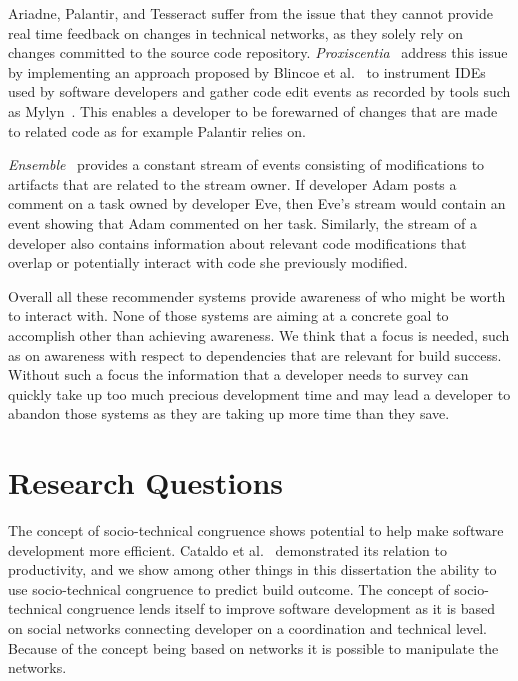 Ariadne, Palantir, and Tesseract suffer from the issue that they cannot provide real time feedback on changes in  technical networks, as they solely rely on changes committed to the source code repository. 
\emph{Proxiscentia}~\cite{borici:chase:2012} address this issue by implementing an approach proposed by Blincoe et al.~\cite{blincoe:cscw:2012} to instrument IDEs used by software developers and gather code edit events as recorded by tools such as Mylyn~\cite{kersten:aosd:2005}.
This enables a developer to be forewarned of changes that are made to related code as for example Palantir relies on.

\emph{Ensemble}~\cite{xiang:rsse:2008} provides a constant stream of events consisting of modifications to artifacts that are related to the stream owner.
If developer Adam posts a comment on a task owned by developer Eve, then Eve's stream would contain an event showing that Adam commented on her task.
Similarly, the stream of a developer also contains information about relevant code modifications that overlap or potentially interact with code she previously modified.

Overall all these recommender systems provide awareness of who might be worth to interact with.
None of those systems are aiming at a concrete goal to accomplish other than achieving awareness.
We think that a focus is needed, such as on awareness with respect to dependencies that are relevant for build success.
Without such a focus the information that a developer needs to survey can quickly take up too much precious development time and may lead a developer to abandon those systems as they are taking up more time than they save.


\section{Research Questions}
The concept of socio-technical congruence shows potential to help make software development more efficient.
Cataldo et al.~\cite{cataldo:cscw:2006} demonstrated its relation to productivity, and we show among other things in this dissertation the ability to use socio-technical congruence to predict build outcome.
The concept of socio-technical congruence lends itself to improve software development as it is based on social networks connecting developer on a coordination and technical level.
Because of the concept being based on networks it is possible to manipulate the networks.

